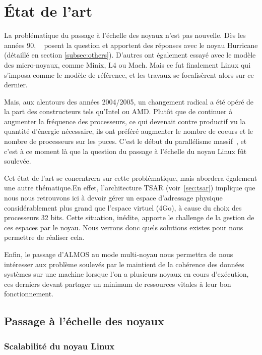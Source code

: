 \section{État de l’art}

  La problématique du passage à l’échelle des noyaux n’est pas nouvelle. Dès les
  années 90, ~\citeauthor{unrau1995hierarchical} posent la question et apportent
  des réponses avec le noyau Hurricane (détaillé en section
  \ref{subsec:others}). D’autres ont également essayé avec le modèle des
  micro-noyaux, comme Minix, L4 ou Mach. Mais ce fut finalement Linux qui
  s’imposa comme le modèle de référence, et les travaux se focalisèrent alors
  sur ce dernier.

  Mais, aux alentours des années 2004/2005, un changement radical a été opéré de
  la part des constructeurs tels qu’Intel ou AMD. Plutôt que de continuer à
  augmenter la fréquence des processeurs, ce qui devenait contre productif vu la
  quantité d’énergie nécessaire, ils ont préféré augmenter le nombre de coeurs
  et le nombre de processeurs sur les puces. C'est le début du parallélisme
  massif~\citep{patterson2011parallel}, et c'est à ce moment là que la question
  du passage à l’échelle du noyau Linux fût soulevée.

  Cet état de l'art se concentrera sur cette problématique, mais abordera
  également une autre thématique.En effet, l'architecture TSAR
  (voir~\ref{sec:tsar}) implique que nous nous retrouvons ici à devoir gérer un
  espace d'adressage physique considérablement plus grand que l'espace virtuel
  (4Go), à cause du choix des processeurs 32 bits. Cette situation, inédite,
  apporte le challenge de la gestion de ces espaces par le noyau. Nous verrons
  donc quels solutions existes pour nous permettre de réaliser cela.
  
  Enfin, le passage d’ALMOS au mode multi-noyau nous permettra de nous
  intéresser aux problème soulevés par le maintient de la cohérence des données
  systèmes sur une machine lorsque l'on a plusieurs noyaux en cours d'exécution,
  ces derniers devant partager un minimum de ressources vitales à leur bon
  fonctionnement.

  \subsection{Passage à l’échelle des noyaux}
  \label{sec:scalability}

    \subsubsection{Scalabilité du noyau Linux}

